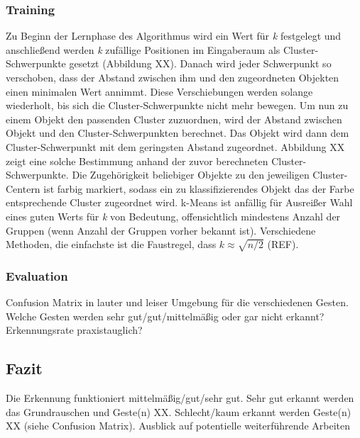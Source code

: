 \subsubsection{Training}
Zu Beginn der Lernphase des Algorithmus wird ein Wert für\emph{ k }festgelegt und anschließend werden\emph{ k }zufällige Positionen im Eingaberaum als Cluster-Schwerpunkte gesetzt (Abbildung XX). Danach wird jeder Schwerpunkt so verschoben, dass der Abstand zwischen ihm und den zugeordneten Objekten einen minimalen Wert annimmt. Diese Verschiebungen werden solange wiederholt, bis sich die Cluster-Schwerpunkte nicht mehr bewegen. 
Um nun zu einem Objekt den passenden Cluster zuzuordnen, wird der Abstand zwischen Objekt und den Cluster-Schwerpunkten berechnet. Das Objekt wird dann dem Cluster-Schwerpunkt mit dem geringsten Abstand zugeordnet. Abbildung XX zeigt eine solche Bestimmung anhand der zuvor berechneten Cluster-Schwerpunkte. Die Zugehörigkeit beliebiger Objekte zu den jeweiligen Cluster-Centern ist farbig markiert, sodass ein zu klassifizierendes Objekt das der Farbe entsprechende Cluster zugeordnet wird.
k-Means ist anfällig für Ausreißer
Wahl eines guten Werts für\emph{ k }von Bedeutung, offensichtlich mindestens Anzahl der Gruppen (wenn Anzahl der Gruppen vorher bekannt ist). Verschiedene Methoden, die einfachste ist die Faustregel, dass $k \approx \sqrt{n/2}$ (REF).


\subsubsection{Evaluation}
Confusion Matrix in lauter und leiser Umgebung für die verschiedenen Gesten. Welche Gesten werden sehr gut/gut/mittelmäßig oder gar nicht erkannt? Erkennungsrate praxistauglich?



\subsection{Fazit}
Die Erkennung funktioniert mittelmäßig/gut/sehr gut. Sehr gut erkannt werden das Grundrauschen und Geste(n) XX. Schlecht/kaum erkannt werden Geste(n) XX (siehe Confusion Matrix). Ausblick auf potentielle weiterführende Arbeiten